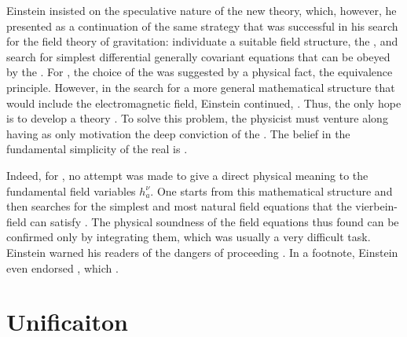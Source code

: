 \documentclass[draft]{article}
\newcommand{\vbein}{vierbein\xspace}
\newcommand{\hbein}{\ensuremath{h_{a}^{\nu}}\xspace}
\newcommand{\FP}{\german{Fernparallelismus}\xspace}
\begin{document}
Einstein insisted on the speculative nature of the new theory, which, however, he presented as a continuation of the same strategy that was successful in his search for the field theory of gravitation: individuate a suitable field structure, the \gmn, and search for simplest differential generally covariant equations that can be obeyed by the \gmn. For \gr, the choice of the \gmn was suggested by a physical fact, the equivalence principle. However, in the search for a more general mathematical structure that would include the electromagnetic field, Einstein continued,  \citep[128]{Einstein1929}.  Thus, the only hope is to develop a theory  \citep[128]{Einstein1929}. To solve this problem, the physicist must venture along  having as only motivation the deep conviction of the  \citep[127]{Einstein1929}. The belief in the fundamental simplicity of the real is  \citep[127]{Einstein1929}. 

Indeed, for \FP, no attempt was made to give a direct physical meaning to the fundamental field variables \hbein. One starts from this mathematical structure and then searches for the simplest and most natural field equations that the \vbein-field can satisfy \citep[131]{Einstein1929}. The physical soundness of the field equations thus found can be confirmed only by integrating them, which was usually a very difficult task. Einstein warned his readers of the dangers of proceeding  \citep[127]{Einstein1929}. In a footnote, Einstein even endorsed , which  \citep[127]{Einstein1929}. 

\section{Unificaiton}
\end{document}
